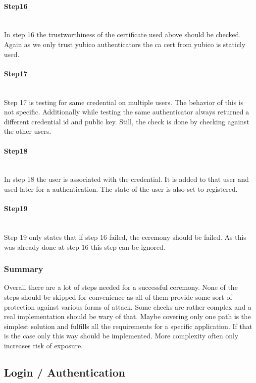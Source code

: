 \documentclass[a4paper, 11pt]{scrartcl}
\begin{document}
\paragraph{Step16}\hfill \\ 
In step 16 the trustworthiness of the certificate used above should be checked. Again as we only trust yubico authenticators the ca cert from yubico is staticly used.

\paragraph{Step17}\hfill \\ 
Step 17 is testing for same credential on multiple users. The behavior of this is not specific. Additionally while testing the same authenticator always returned a different credential id and public key. Still, the check is done by checking against the other users.

\paragraph{Step18}\hfill \\ 
In step 18 the user is associated with the credential. It is added to that user and used later for a authentication. The state of the user is also set to registered. 

\paragraph{Step19}\hfill \\ 
Step 19 only states that if step 16 failed, the ceremony should be failed. As this was already done at step 16 this step can be ignored.

\subsubsection{Summary}
Overall there are a lot of steps needed for a successful ceremony. None of the steps should be skipped for convenience as all of them provide some sort of protection against various forms of attack. Some checks are rather complex and a real implementation should be wary of that. Maybe covering only one path is the simplest solution and fulfills all the requirements for a specific application. If that is the case only this way should be implemented. More complexity often only increases risk of exposure.

\subsection{Login / Authentication}
\end{document}
